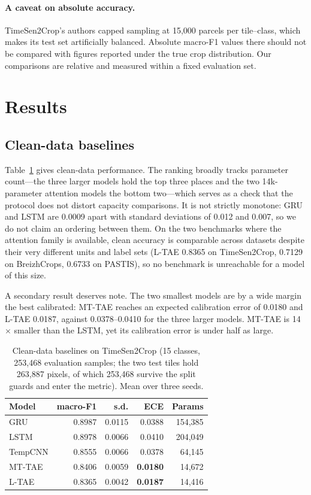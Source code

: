 \documentclass[journal]{IEEEtran}
\begin{document}
\paragraph{A caveat on absolute accuracy.}
TimeSen2Crop's authors capped sampling at 15{,}000 parcels per tile--class,
which makes its test set artificially balanced. Absolute macro-F1 values there
should not be compared with figures reported under the true crop distribution.
Our comparisons are relative and measured within a fixed evaluation set.

\section{Results}
\label{sec:results}

\subsection{Clean-data baselines}
Table~\ref{tab:baselines} gives clean-data performance. The ranking broadly
tracks parameter count---the three larger models hold the top three places and
the two 14k-parameter attention models the bottom two---which serves as a check
that the protocol does not distort capacity comparisons. It is not strictly
monotone: GRU and LSTM are 0.0009 apart with standard deviations of 0.012 and
0.007, so we do not claim an ordering between them. On the two benchmarks where
the attention family is available, clean accuracy is comparable across datasets
despite their very different units and label sets (L-TAE 0.8365 on
TimeSen2Crop, 0.7129 on BreizhCrops, 0.6733 on PASTIS), so no benchmark is
unreachable for a model of this size.

A secondary result deserves note. The two smallest models are by a wide margin
the best calibrated: MT-TAE reaches an expected calibration error of 0.0180 and
L-TAE 0.0187, against 0.0378--0.0410 for the three larger models. MT-TAE is
14$\times$ smaller than the LSTM, yet its calibration error is under half as
large.

\begin{table}[t]
\centering
\caption{Clean-data baselines on TimeSen2Crop (15 classes, 253{,}468 evaluation
samples; the two test tiles hold 263{,}887 pixels, of which 253{,}468 survive
the split guards and enter the metric). Mean over three seeds.}
\label{tab:baselines}
\begin{tabular}{lrrrr}
\toprule
Model & macro-F1 & s.d. & ECE & Params \\
\midrule
GRU     & 0.8987 & 0.0115 & 0.0388 & 154{,}385 \\
LSTM    & 0.8978 & 0.0066 & 0.0410 & 204{,}049 \\
TempCNN & 0.8555 & 0.0066 & 0.0378 & 64{,}145 \\
MT-TAE  & 0.8406 & 0.0059 & \textbf{0.0180} & 14{,}672 \\
L-TAE   & 0.8365 & 0.0042 & \textbf{0.0187} & 14{,}416 \\
\bottomrule
\end{tabular}
\end{table}
\end{document}
